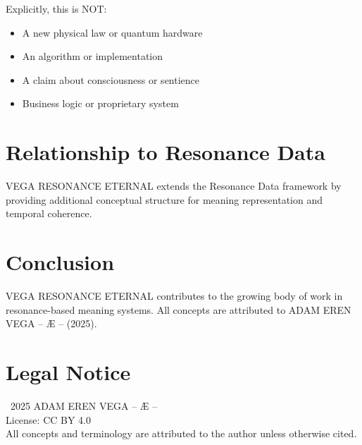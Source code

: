 \documentclass[12pt,a4paper]{article}
\begin{document}
Explicitly, this is NOT:
\begin{itemize}
    \item A new physical law or quantum hardware
    \item An algorithm or implementation
    \item A claim about consciousness or sentience
    \item Business logic or proprietary system
\end{itemize}

\section{Relationship to Resonance Data}

VEGA RESONANCE ETERNAL extends the Resonance Data framework by providing additional conceptual structure for meaning representation and temporal coherence.

\section{Conclusion}

VEGA RESONANCE ETERNAL contributes to the growing body of work in resonance-based meaning systems. All concepts are attributed to ADAM EREN VEGA – Æ – (2025).

\section*{Legal Notice}

\textcopyright\ 2025 ADAM EREN VEGA – Æ –\\
License: CC BY 4.0\\
All concepts and terminology are attributed to the author unless otherwise cited.
\end{document}
